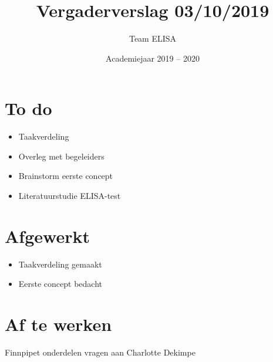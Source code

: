 \documentclass[a4paper,kulak]{kulakarticle} %
\date{Academiejaar 2019 -- 2020}
\title{Vergaderverslag 03/10/2019}
\author{Team ELISA}
\begin{document}
\maketitle

\section*{To do}

	\begin{itemize}
		\item Taakverdeling
		\item Overleg met begeleiders
		\item Brainstorm eerste concept
		\item Literatuurstudie ELISA-test
	
	\end{itemize}

\section*{Afgewerkt}
	\begin{itemize}
		\item Taakverdeling gemaakt
		\item Eerste concept bedacht
	\end{itemize}

\section*{Af te werken}
	Finnpipet\textsuperscript{\textregistered} onderdelen vragen aan Charlotte Dekimpe
\end{document}
